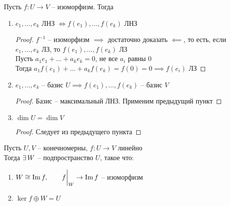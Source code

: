 \begin{property}
	Пусть $ f : U \to V $ -- изоморфизм. Тогда
    \begin{enumerate}
    	\item $ e_1, ..., e_k $ ЛНЗ $ \iff f(e_1), ..., f(e_k) $ ЛНЗ
        \begin{proof}
            $ f^{-1} $ -- изоморфизм $ \implies $ достаточно доказать $ \impliedby $, то есть, если $ e_1, ..., e_k $ ЛЗ, то $ f(e_1), ..., f(e_k) $ ЛЗ \\
            Пусть $ a_1e_1 + ... + a_ke_k = 0 $, не все $ a_i$ равны 0 \\
            Тогда $ a_1f(e_1) + ... + a_kf(e_k) = f(0) = 0 \implies f(e_i) $ ЛЗ
        \end{proof}
        \item $ e_1, ..., e_k $ -- базис $ U \implies f(e_1), ..., f(e_k) $ -- базис $ V $
        \begin{proof}
        	Базис -- максимальный ЛНЗ. Применим предыдущий пункт
        \end{proof}
        \item $ \dim U = \dim V $
        \begin{proof}
        	Следует из предыдущего пункта
        \end{proof}
    \end{enumerate}
\end{property}

\begin{lemma}
	Пусть $ U, V $ -- конечномерны, $ f : U \to V $ линейно \\
    Тогда $ \exists\, W $ -- подпространство $ U $, такое что:
    \begin{enumerate}
        \item $ W \cong \operatorname{Im} f, \qquad f \bigg|_{W}^{} \to \operatorname{Im} f $ -- изоморфизм
        \item $ \ker f \oplus W = U $
    \end{enumerate}
\end{lemma}

